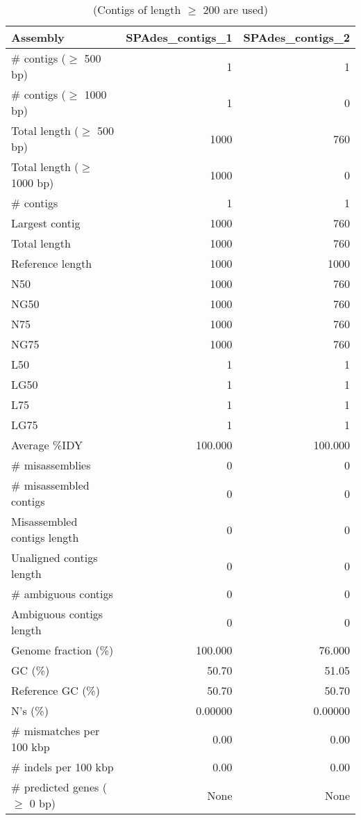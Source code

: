 \begin{table}[ht]
\begin{center}
\caption{(Contigs of length $\geq$ 200 are used)}
\begin{tabular}{|l*{2}{|r}|}
\hline
Assembly & SPAdes\_contigs\_1 & SPAdes\_contigs\_2 \\ \hline
\# contigs ($\geq$ 500 bp) & 1 & 1 \\ \hline
\# contigs ($\geq$ 1000 bp) & 1 & 0 \\ \hline
Total length ($\geq$ 500 bp) & 1000 & 760 \\ \hline
Total length ($\geq$ 1000 bp) & 1000 & 0 \\ \hline
\# contigs & 1 & 1 \\ \hline
Largest contig & 1000 & 760 \\ \hline
Total length & 1000 & 760 \\ \hline
Reference length & 1000 & 1000 \\ \hline
N50 & 1000 & 760 \\ \hline
NG50 & 1000 & 760 \\ \hline
N75 & 1000 & 760 \\ \hline
NG75 & 1000 & 760 \\ \hline
L50 & 1 & 1 \\ \hline
LG50 & 1 & 1 \\ \hline
L75 & 1 & 1 \\ \hline
LG75 & 1 & 1 \\ \hline
Average \%IDY & 100.000 & 100.000 \\ \hline
\# misassemblies & 0 & 0 \\ \hline
\# misassembled contigs & 0 & 0 \\ \hline
Misassembled contigs length & 0 & 0 \\ \hline
Unaligned contigs length & 0 & 0 \\ \hline
\# ambiguous contigs & 0 & 0 \\ \hline
Ambiguous contigs length & 0 & 0 \\ \hline
Genome fraction (\%) & 100.000 & 76.000 \\ \hline
GC (\%) & 50.70 & 51.05 \\ \hline
Reference GC (\%) & 50.70 & 50.70 \\ \hline
N's (\%) & 0.00000 & 0.00000 \\ \hline
\# mismatches per 100 kbp & 0.00 & 0.00 \\ \hline
\# indels per 100 kbp & 0.00 & 0.00 \\ \hline
\# predicted genes ($\geq$ 0 bp) & None & None \\ \hline

\end{tabular}
\end{center}
\end{table}
